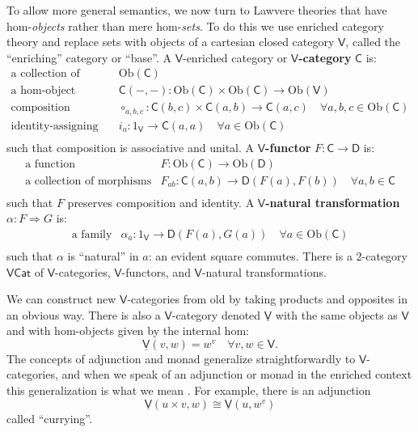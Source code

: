 \documentclass{amsart}
\theoremstyle{definition}
\newcommand{\Cat}{\mathsf{Cat}}
\newcommand{\V}{\mathsf{V}}
\newcommand{\D}{\mathsf{D}}
\newcommand{\C}{\mathsf{C}}
\newcommand{\Obj}{\mathrm{Ob}}
\newcommand{\maps}{\colon}
\begin{document}
To allow more general semantics, we now turn to Lawvere theories that have hom-\emph{objects} rather than mere hom-\emph{sets}.  To do this we use enriched category theory \cite{kelly} and replace sets with objects of a cartesian closed category $\V$, called the ``enriching'' category or ``base''.    A $\V$-enriched category or \textbf{$\V$-category} $\C$ is:
\[\begin{array}{rl}
\text{a collection of objects} & \Obj(\C)\\
\text{a hom-object function} & \C(-,-)\maps \Obj(\C) \times \Obj(\C) \to \Obj(\V)\\
\text{composition morphisms} & \circ_{a,b,c}\maps\C(b,c) \times \C(a,b) \to \C(a,c) \quad \forall a,b,c \in \Obj(\C)\\
\text{identity-assigning morphisms} & i_a\maps 1_\V \to\C(a,a) \quad \forall a \in \Obj(\C)\\
\end{array}\]
such that composition is associative and unital.  A \textbf{$\V$-functor} $F \maps \C \to \D$ is:
\[\begin{array}{rl}
\text{a function} & F\maps \Obj(\C) \to \Obj(\D)\\
\text{a collection of morphisms} & F_{ab}\maps \C(a,b) \to \D(F(a),F(b)) \quad \forall a,b \in \C\\
\end{array}\]
such that $F$ preserves composition and identity.  A \textbf{$\V$-natural transformation} $\alpha\maps F \Rightarrow G$ is:
\[\begin{array}{rl}
\text{a family} & \alpha_a \maps 1_\V \to \D(F(a),G(a)) \quad \forall a \in \Obj(\C)\\
\end{array}\]
such that $\alpha$ is ``natural'' in $a$: an evident square commutes.   There is a 2-category \textbf{$\V\Cat$} of $\V$-categories, $\V$-functors, and $\V$-natural transformations. 

We can construct new $\V$-categories from old by taking products and opposites in an obvious way.   There is also a $\V$-category denoted $\underline{\V}$ with the same objects as 
$\V$ and with hom-objects given by the internal hom:
\[   \underline{\V}(v,w) = w^v   \quad \forall v,w \in \V  .\]
The concepts of adjunction and monad generalize straightforwardly to $\V$-categories,
and when we speak of an adjunction or monad in the enriched context this generalization
is what we mean \cite{kelly}.   For example, there is an adjunction
\[    \underline{\V}(u \times v, w) \cong \underline{\V}(u, w^v ) \]
called ``currying''.    
\end{document}
